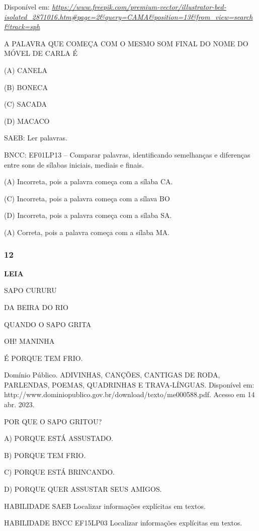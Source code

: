 Disponível em:
\href{https://www.freepik.com/premium-vector/illustrator-bed-isolated_2871016.htm\#page=2\&query=CAMA\&position=13\&from_view=search\&track=sph}{\emph{https://www.freepik.com/premium-vector/illustrator-bed-isolated\_2871016.htm\#page=2\&query=CAMA\&position=13\&from\_view=search\&track=sph}}

A PALAVRA QUE COMEÇA COM O MESMO SOM FINAL DO NOME DO MÓVEL DE CARLA É

(A) CANELA

(B) BONECA

(C) SACADA

(D) MACACO

SAEB: Ler palavras.

BNCC: EF01LP13 -- Comparar palavras, identificando semelhanças e diferenças entre sons de sílabas iniciais, mediais e finais.

(A) Incorreta, pois a palavra começa com a sílaba CA.

(C) Incorreta, pois a palavra começa com a sílava BO

(D) Incorreta, pois a palavra começa com a sílaba SA.

(A) Correta, pois a palavra começa com a sílaba MA.

\subsubsection{12}\label{section-68}

\textbf{LEIA}

SAPO CURURU

DA BEIRA DO RIO

QUANDO O SAPO GRITA

OH! MANINHA

É PORQUE TEM FRIO.

Domínio Público. ADIVINHAS, CANÇÕES, CANTIGAS DE RODA, PARLENDAS, POEMAS, QUADRINHAS E TRAVA-LÍNGUAS. Disponível em: http://www.dominiopublico.gov.br/download/texto/me000588.pdf. Acesso em 14 abr. 2023.

POR QUE O SAPO GRITOU?

A) PORQUE ESTÁ ASSUSTADO.

B) PORQUE TEM FRIO.

C) PORQUE ESTÁ BRINCANDO.

D) PORQUE QUER ASSUSTAR SEUS AMIGOS.

HABILIDADE SAEB Localizar informações explícitas em textos.

HABILIDADE BNCC EF15LP03 Localizar informações explícitas em textos.

